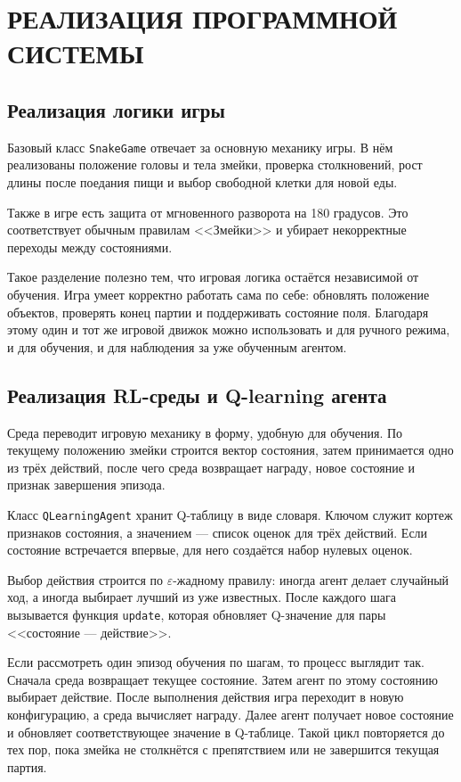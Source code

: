 \chapter{РЕАЛИЗАЦИЯ ПРОГРАММНОЙ СИСТЕМЫ}

\section{Реализация логики игры}

Базовый класс \texttt{SnakeGame} отвечает за основную механику игры. В нём реализованы положение головы и тела змейки, проверка столкновений, рост длины после поедания пищи и выбор свободной клетки для новой еды.

Также в игре есть защита от мгновенного разворота на 180 градусов. Это соответствует обычным правилам <<Змейки>> и убирает некорректные переходы между состояниями.

Такое разделение полезно тем, что игровая логика остаётся независимой от обучения. Игра умеет корректно работать сама по себе: обновлять положение объектов, проверять конец партии и поддерживать состояние поля. Благодаря этому один и тот же игровой движок можно использовать и для ручного режима, и для обучения, и для наблюдения за уже обученным агентом.

\section{Реализация RL-среды и Q-learning агента}

Среда переводит игровую механику в форму, удобную для обучения. По текущему положению змейки строится вектор состояния, затем принимается одно из трёх действий, после чего среда возвращает награду, новое состояние и признак завершения эпизода.

Класс \texttt{QLearningAgent} хранит Q-таблицу в виде словаря. Ключом служит кортеж признаков состояния, а значением --- список оценок для трёх действий. Если состояние встречается впервые, для него создаётся набор нулевых оценок.

Выбор действия строится по $\varepsilon$-жадному правилу: иногда агент делает случайный ход, а иногда выбирает лучший из уже известных. После каждого шага вызывается функция \texttt{update}, которая обновляет Q-значение для пары <<состояние --- действие>>.

Если рассмотреть один эпизод обучения по шагам, то процесс выглядит так. Сначала среда возвращает текущее состояние. Затем агент по этому состоянию выбирает действие. После выполнения действия игра переходит в новую конфигурацию, а среда вычисляет награду. Далее агент получает новое состояние и обновляет соответствующее значение в Q-таблице. Такой цикл повторяется до тех пор, пока змейка не столкнётся с препятствием или не завершится текущая партия.

